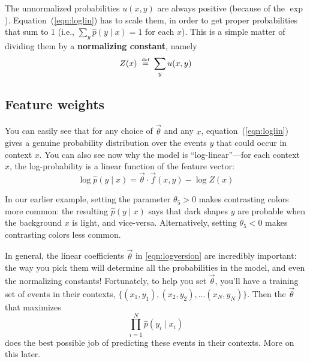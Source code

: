 \documentclass[11pt]{article}
\newcommand{\defeq}{\;\stackrel{\mbox{\tiny def}}{=}\;}
\newcommand{\vtheta}{\vec{\theta}}
\newcommand{\ph}{\hat{p}}
\begin{document}
The unnormalized probabilities $u(x,y)$ are always positive (because of the $\exp$).
Equation~(\ref{eqn:loglin}) has to scale them, in order to get proper
probabilities that sum to 1 (i.e., $\sum_y \ph(y\mid x) = 1$ for each
$x$).  This is a simple matter of dividing them by a {\bf normalizing
  constant}, namely
\begin{equation}
  Z(x) \defeq \sum_y u(x,y)
\end{equation}

\subsection{Feature weights}

You can easily see that for any choice of $\vtheta$ and any $x$,
equation~(\ref{eqn:loglin}) gives a genuine probability distribution
over the events $y$ that could occur in context $x$.  You can also see
now why the model is ``log-linear''---for each context $x$, the
log-probability is a linear function of the feature vector:
\begin{equation}\label{eqn:logversion}
\log \ph(y \mid x) = \vtheta \cdot \vec{f}(x,y) - \log Z(x)
\end{equation}


In our earlier example, setting the parameter $\theta_5 > 0$ makes
contrasting colors more common: the resulting $\ph(y \mid x)$ says
that dark shapes $y$ are probable when the background $x$ is light,
and vice-versa.  Alternatively, setting $\theta_5 < 0$ makes
contrasting colors less common.

In general, the linear coefficients $\vtheta$ in \eqref{eqn:logversion} are incredibly
important: the way you pick them will determine all the probabilities
in the model, and even the normalizing constants!  Fortunately, to
help you set $\vtheta$, you'll have a training set of events in their
contexts, $\{(x_1,y_1), (x_2,y_2), \ldots (x_N,y_N)\}$.  Then the
$\vtheta$ that maximizes
\begin{equation}\label{eqn:loglin-likelihood}
\prod_{i=1}^N \ph(y_i \mid x_i)
\end{equation}
does the best possible job of predicting these events in their
contexts.  More on this later.
\end{document}
